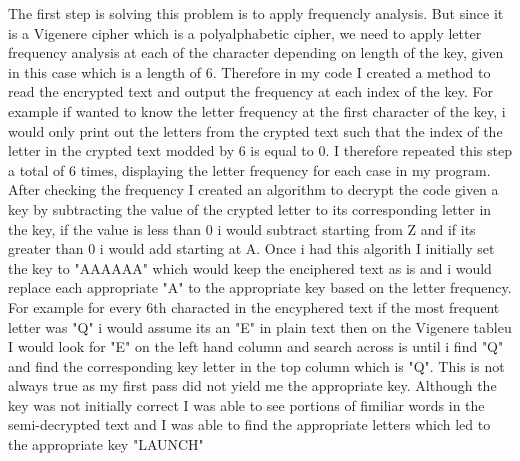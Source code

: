 \documentclass{assignment}
\begin{document}
\begin{problemlist}
The first step is solving this problem is to apply frequencly analysis. But since it is a Vigenere cipher which is a polyalphabetic cipher, we need to apply letter frequency analysis at each of the character depending on length of the key, given in this case which is a length of 6. Therefore in my code I created a method to read the encrypted text and output the frequency at each index of the key. For example if wanted to know the letter frequency at the first character of the key, i would only print out the letters from the crypted text such that the index of the letter in the crypted text modded by 6 is equal to 0. I therefore repeated this step a total of 6 times, displaying the letter frequency for each case in my program. After checking the frequency I created an algorithm to decrypt the code given a key by subtracting the value of the crypted letter to its corresponding letter in the key, if the value is less than 0 i would subtract starting from Z and if its greater than 0 i would add starting at A. Once i had this algorith I initially set the key to "AAAAAA" which would keep the enciphered text as is and i would replace each appropriate "A" to the appropriate key based on the letter frequency. For example for every 6th characted in the encyphered text if the most frequent letter was "Q" i would assume its an "E" in plain text then on the Vigenere tableu I would look for "E" on the left hand column and search across is until i find "Q" and find the corresponding key letter in the top column which is "Q". This is not always true as my first pass did not yield me the appropriate key. Although the key was not initially correct I was able to see portions of fimiliar words in the semi-decrypted text and I was able to find the appropriate letters which led to the appropriate key "LAUNCH" 

\begin{problem}
\begin{answer}

\end{answer}
\end{problem}

\end{problemlist}
\end{document}
